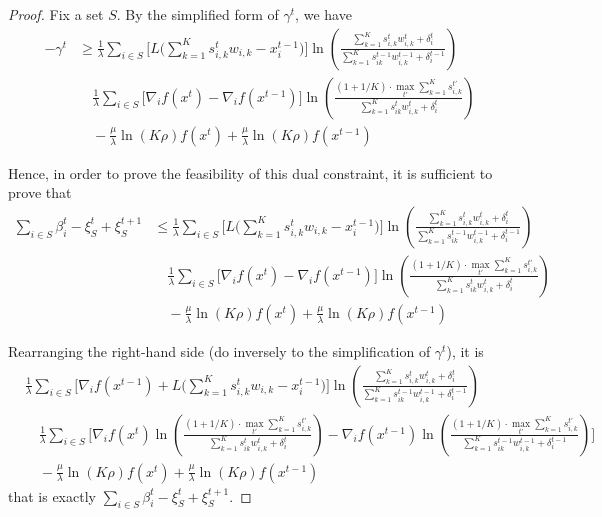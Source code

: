 \begin{proof}
Fix a set $S$. By the simplified form of $\gamma^{t}$, we have
\begin{align*}
-\gamma^{t} &\geq     \frac{1}{\lambda} \sum_{i \in S} \biggl[ L\biggl( \sum_{k=1}^{K} s_{i,k}^{t} w_{i,k}  - x_{i}^{t-1} \biggr) \biggr]  \ln \left( \frac{\sum_{k=1}^{K} s_{i,k}^{t} w_{i,k}^{t} + \delta_{i}^{t}}{\sum_{k=1}^{K}  s_{ik}^{t-1}w_{i,k}^{t-1}  + \delta_{i}^{t-1}} \right) \\
        & \quad  \frac{1}{\lambda} \sum_{i \in S} \biggl[ \nabla_{i} f(x^{t}) - \nabla_{i} f(x^{t-1}) \biggr] \ln \left( \frac{(1 + 1/K) \cdot \max_{t'} \sum_{k=1}^{K} s_{i,k}^{t'}}{\sum_{k=1}^{K}  s_{ik}^{t}w_{i,k}^{t}  + \delta_{i}^{t}} \right)  \\
    & \quad - \frac{\mu}{\lambda} \ln(K\rho) f(x^{t}) + \frac{\mu}{\lambda} \ln(K\rho) f(x^{t-1})
\end{align*}

Hence, in order to prove the feasibility of this dual constraint, it is sufficient to prove that
\begin{align*}
\sum_{i \in S}\beta_{i}^{t} - \xi_{S}^{t} + \xi_{S}^{t+1}  &\leq     \frac{1}{\lambda} \sum_{i \in S} \biggl[ L\biggl( \sum_{k=1}^{K} s_{i,k}^{t} w_{i,k}  - x_{i}^{t-1} \biggr) \biggr]  \ln \left( \frac{\sum_{k=1}^{K} s_{i,k}^{t} w_{i,k}^{t} + \delta_{i}^{t}}{\sum_{k=1}^{K}  s_{ik}^{t-1}w_{i,k}^{t-1}  + \delta_{i}^{t-1}} \right) \\
        & \quad  \frac{1}{\lambda} \sum_{i \in S} \biggl[ \nabla_{i} f(x^{t}) - \nabla_{i} f(x^{t-1}) \biggr] \ln \left( \frac{(1 + 1/K) \cdot \max_{t'} \sum_{k=1}^{K} s_{i,k}^{t'}}{\sum_{k=1}^{K}  s_{ik}^{t}w_{i,k}^{t}  + \delta_{i}^{t}} \right)  \\
    & \quad - \frac{\mu}{\lambda} \ln(K\rho) f(x^{t}) + \frac{\mu}{\lambda} \ln(K\rho) f(x^{t-1})
\end{align*}

Rearranging the right-hand side (do inversely to the simplification of $\gamma^{t}$), it is
\begin{align*}
&\frac{1}{\lambda} \sum_{i \in S} \biggl[  \nabla_{i} f(x^{t-1}) + L\biggl( \sum_{k=1}^{K} s_{i,k}^{t} w_{i,k}  - x_{i}^{t-1} \biggr) \biggr]  \ln \left( \frac{\sum_{k=1}^{K} s_{i,k}^{t} w_{i,k}^{t} + \delta_{i}^{t}}{\sum_{k=1}^{K}  s_{ik}^{t-1}w_{i,k}^{t-1}  + \delta_{i}^{t-1}} \right) \\
        & \quad  \frac{1}{\lambda} \sum_{i \in S} \biggl[ \nabla_{i} f(x^{t}) \ln \left( \frac{(1 + 1/K) \cdot \max_{t'} \sum_{k=1}^{K} s_{i,k}^{t'}}{\sum_{k=1}^{K}  s_{ik}^{t}w_{i,k}^{t}  + \delta_{i}^{t}} \right) -  \nabla_{i} f(x^{t-1}) \ln \left( \frac{(1 + 1/K) \cdot \max_{t'} \sum_{k=1}^{K} s_{i,k}^{t'}}{\sum_{k=1}^{K}  s_{ik}^{t-1}w_{i,k}^{t-1}  + \delta_{i}^{t-1}} \right) \biggr] \\
    & \quad - \frac{\mu}{\lambda} \ln(K\rho) f(x^{t}) + \frac{\mu}{\lambda} \ln(K\rho) f(x^{t-1})
\end{align*}
that is exactly $\sum_{i \in S}\beta_{i}^{t} - \xi_{S}^{t} + \xi_{S}^{t+1}$.

\end{proof}


